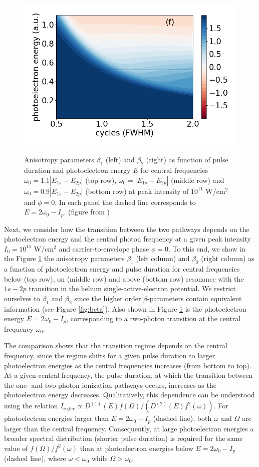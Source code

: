 \begin{figure}[!ht]
\includegraphics[width=0.40\linewidth]{figs/Photo_ionization/short_pulse/energy_d0p9_beta_2_I_1_heat.png}\\
\caption{
Anisotropy parameters $\beta_1$ (left) and $\beta_2$ (right) as function of pulse duration and photoelectron energy $E$ for central frequencies $\omega_0 = 1.1 |E_{1s}-E_{2p}|$ (top row), $\omega_0 = |E_{1s}-E_{2p}|$ (middle row) and $\omega_0 = 0.9 |E_{1s}-E_{2p}|$ (bottom row) at peak intensity of $10^{11}$ W/cm$^2$ and $\phi = 0$. In each panel the dashed line corresponds to $E = 2\omega_0 - I_p$.  (figure from \cite{venzke2020_ionization})
} 
  \label{fig:beta_omega}
\end{figure}

Next, we consider how the transition between the two pathways depends on the photoelectron energy and the central photon frequency at a given peak intensity $I_0 = 10^{11}$ W/cm$^2$ and carrier-to-envelope phase $\phi = 0$. To this end, we show in the Figure \ref{fig:beta_omega} the 
anisotropy parameters $\beta_1$ (left column) and $\beta_2$ (right column) as a function of photoelectron energy and pulse duration for central frequencies below (top row), on (middle row) and above (bottom row) resonance with the $1s - 2p$ transition in the helium single-active-electron potential. We restrict ourselves to $\beta_1$ and $\beta_2$ since the higher order $\beta$-parameters contain equivalent information (see Figure \ref{fig:beta}). Also shown in Figure \ref{fig:beta_omega} is the photoelectron energy $E = 2\omega_0 - I_p$, corresponding to a two-photon transition at the central frequency $\omega_0$. 

The comparison shows that the transition regime depends on the central frequency, since the regime shifts for a given pulse duration to larger photoelectron energies as the central frequencies increases (from bottom to top). At a given central frequency, the pulse duration, at which the transition between the one- and two-photon ionization pathways occurs, increases as the photoelectron energy decreases. Qualitatively, this dependence can be understood using the relation $I_{infer} \propto D^{(1)}(E)f(\Omega)/(D^{(2)}(E)f^2(\omega))$. For photoelectron energies larger than $E = 2\omega_0 - I_p$ (dashed line), both $\omega$ and $\Omega$ are larger than the central frequency. Consequently, at large photoelectron energies a broader spectral distribution (shorter pulse duration) is required for the same value of $f(\Omega)/f^2(\omega)$ than at photoelectron energies below $E = 2\omega_0 - I_p$ (dashed line), where $\omega < \omega_0$ while $\Omega > \omega_0$. 

